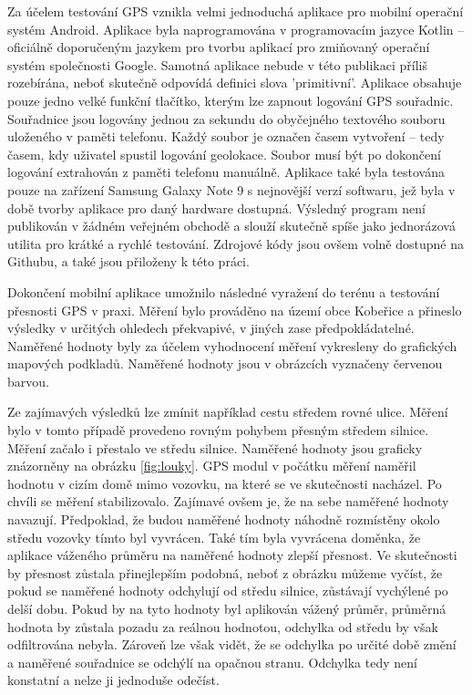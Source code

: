 \documentclass[czech, bachelor]{diploma}
\begin{document}
Za účelem testování GPS vznikla velmi jednoduchá aplikace pro mobilní operační systém Android. Aplikace byla naprogramována 
v programovacím jazyce Kotlin -- oficiálně doporučeným jazykem pro tvorbu aplikací pro zmiňovaný operační systém společnosti 
Google. Samotná aplikace nebude v této publikaci příliš rozebírána, neboť skutečně odpovídá definici slova 'primitivní'. Aplikace
obsahuje pouze jedno velké funkční tlačítko, kterým lze zapnout logování GPS souřadnic. Souřadnice jsou logovány jednou za sekundu
do obyčejného textového souboru uloženého v paměti telefonu. Každý soubor je označen časem vytvoření -- tedy časem, kdy uživatel
spustil logování geolokace. Soubor musí být po dokončení logování extrahován z paměti telefonu manuálně. Aplikace také byla 
testována pouze na zařízení Samsung Galaxy Note 9 s nejnovější verzí softwaru, jež byla v době tvorby aplikace pro daný hardware
dostupná. Výsledný program není publikován v žádném veřejném obchodě a slouží skutečně spíše jako jednorázová utilita pro krátké
a rychlé testování. Zdrojové kódy jsou ovšem volně dostupné na Githubu, %
a také jsou přiloženy k této práci.

Dokončení mobilní aplikace umožnilo následné vyražení do terénu a testování přesnosti GPS v praxi. Měření bylo prováděno na území
obce Kobeřice a přineslo výsledky v určitých ohledech překvapivé, v jiných zase předpokládatelné. Naměřené hodnoty byly za účelem
vyhodnocení měření vykresleny do grafických mapových podkladů. Naměřené hodnoty jsou v obrázcích vyznačeny červenou barvou.

Ze zajímavých výsledků lze zmínit například cestu středem rovné ulice. Měření bylo v tomto případě provedeno rovným pohybem 
přesným středem silnice. Měření začalo i přestalo ve středu silnice. Naměřené hodnoty jsou graficky znázorněny na obrázku 
\ref{fig:louky}. GPS modul v počátku měření naměřil hodnotu v cizím domě mimo vozovku, na které se ve skutečnosti nacházel. 
Po chvíli se měření stabilizovalo. Zajímavé ovšem je, že na sebe naměřené hodnoty navazují. Předpoklad, že budou naměřené hodnoty
náhodně rozmístěny okolo středu vozovky tímto byl vyvrácen. Také tím byla vyvrácena doměnka, že aplikace váženého průměru 
na naměřené hodnoty zlepší přesnost. Ve skutečnosti by přesnost zůstala přinejlepším podobná, neboť z obrázku můžeme vyčíst, že
pokud se naměřené hodnoty odchylují od středu silnice, zůstávají vychýlené po delší dobu. Pokud by na tyto hodnoty byl aplikován
vážený průměr, průměrná hodnota by zůstala pozadu za reálnou hodnotou, odchylka od středu by však odfiltrována nebyla.
Zároveň lze však vidět, že se odchylka po určité době změní a naměřené souřadnice se odchýlí na opačnou stranu. Odchylka tedy není
konstatní a nelze ji jednoduše odečíst.
\end{document}
